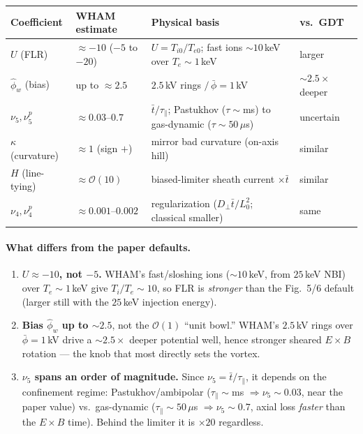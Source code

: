 \documentclass[11pt]{article}
\begin{document}
\begin{center}
\begin{tabular}{p{2.1cm} p{2.9cm} p{5.0cm} p{2.0cm}}
\toprule
Coefficient & WHAM estimate & Physical basis & vs.\ GDT\\
\midrule
$U$ (FLR)            & $\approx -10$ ($-5$ to $-20$) & $U=T_{i0}/T_{e0}$; fast ions $\sim\!10\,$keV over $T_e\!\sim\!1\,$keV & larger\\
$\hat\phi_w$ (bias)  & up to $\approx 2.5$           & $2.5\,$kV rings $/\,\bar\phi=1\,$kV & $\sim\!2.5\times$ deeper\\
$\nu_5,\nu_5^p$      & $\approx 0.03$--$0.7$         & $\bar t/\tau_\parallel$; Pastukhov ($\tau\!\sim\!$ms) to gas-dynamic ($\tau\!\sim\!50\,\mu$s) & uncertain\\
$\kappa$ (curvature) & $\approx 1$ (sign $+$)        & mirror bad curvature (on-axis hill) & similar\\
$H$ (line-tying)     & $\approx \mathcal{O}(10)$     & biased-limiter sheath current $\times\bar t$ & similar\\
$\nu_4,\nu_4^p$      & $\approx 0.001$--$0.002$      & regularization ($D_\perp\bar t/L_0^2$; classical smaller) & same\\
\bottomrule
\end{tabular}
\end{center}

\paragraph{What differs from the paper defaults.}
\begin{enumerate}
\item \textbf{$U\approx-10$, not $-5$.} WHAM's fast/sloshing ions ($\sim\!10\,$keV,
from $25\,$keV NBI) over $T_e\sim1\,$keV give $T_i/T_e\sim10$, so FLR is
\emph{stronger} than the Fig.~5/6 default (larger still with the $25\,$keV
injection energy).
\item \textbf{Bias $\hat\phi_w$ up to $\sim2.5$}, not the $\mathcal{O}(1)$ ``unit
bowl.'' WHAM's $2.5\,$kV rings over $\bar\phi=1\,$kV drive a $\sim2.5\times$ deeper
potential well, hence stronger sheared $E\times B$ rotation --- the knob that most
directly sets the vortex.
\item \textbf{$\nu_5$ spans an order of magnitude.} Since $\nu_5=\bar t/\tau_\parallel$,
it depends on the confinement regime: Pastukhov/ambipolar ($\tau_\parallel\!\sim\!$ms
$\Rightarrow\nu_5\!\sim\!0.03$, near the paper value) vs.\ gas-dynamic
($\tau_\parallel\!\sim\!50\,\mu$s $\Rightarrow\nu_5\!\sim\!0.7$, axial loss
\emph{faster} than the $E\times B$ time). Behind the limiter it is $\times20$
regardless.
\end{enumerate}
\end{document}
